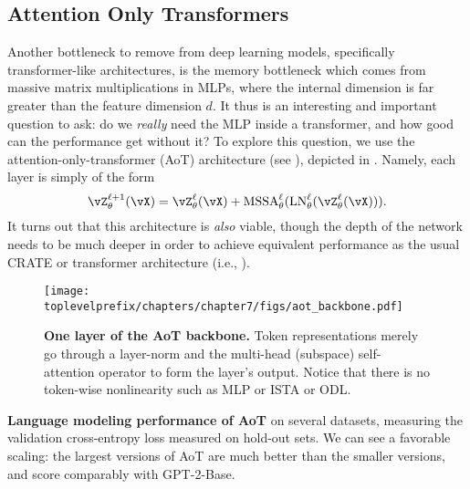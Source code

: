 \documentclass[../../book-main.tex]{subfiles}
\begin{document}
\subsection{Attention Only Transformers} \label{sub:aot_experiments}

Another bottleneck to remove from deep learning models, specifically transformer-like architectures, is the memory bottleneck which comes from massive matrix multiplications in MLPs, where the internal dimension is far greater than the feature dimension \(d\). It thus is an interesting and important question to ask: do we \textit{really} need the MLP inside a transformer, and how good can the performance get without it? To explore this question, we use the attention-only-transformer (AoT) architecture (see ), depicted in . Namely, each layer is simply of the form 
\begin{equation}
    \vZ_{\theta}^{\ell + 1}(\vX) = \vZ_{\theta}^{\ell}(\vX) + \MSSA_{\theta}^{\ell}(\LN_{\theta}^{\ell}(\vZ_{\theta}^{\ell}(\vX))).
\end{equation}
It turns out that this architecture is \textit{also} viable, though the depth of the network needs to be much deeper in order to achieve equivalent performance as the usual CRATE or transformer architecture (i.e., ).


\begin{figure}
    \centering 
    \texttt{[image: \\toplevelprefix/chapters/chapter7/figs/aot\_backbone.pdf]}
    \caption{\small\textbf{One layer of the AoT backbone.} Token representations merely go through a layer-norm and the multi-head (subspace) self-attention operator to form the layer's output. Notice that there is no token-wise nonlinearity such as MLP or ISTA or ODL.}
    \label{fig:aot_backbone}
\end{figure}

\begin{table}
    \centering 
    \caption{\small\textbf{Language modeling performance of AoT} on several datasets, measuring the validation cross-entropy loss measured on hold-out sets. We can see a favorable scaling: the largest versions of AoT are much better than the smaller versions, and score comparably with GPT-2-Base.}
    \label{tab:aot_lm}
\end{table}
\end{document}
